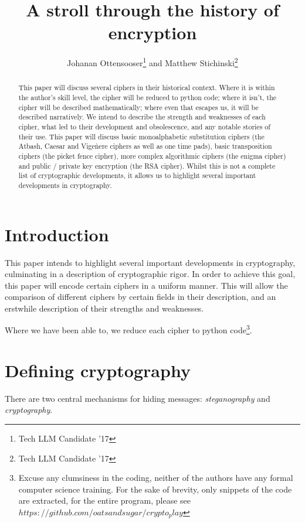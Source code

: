 \documentclass{AIAA}
\begin{document}
\title{A stroll through the history of encryption}

\author{Johanan Ottensooser\footnote{Tech LLM Candidate '17} and Matthew Stichinski\footnote{Tech LLM Candidate '17}}

\begin{abstract}
This paper will discuss several ciphers in their historical context. Where it is within the author's skill level, the cipher will be reduced to python code; where it isn't, the cipher will be described mathematically; where even that escapes us, it will be described narratively. We intend to describe the strength and weaknesses of each cipher, what led to their development and obsolescence, and any notable stories of their use. This paper will discuss basic monoalphabetic substitution ciphers (the Atbash, Caesar and Vige\`nere ciphers as well as one time pads), basic transposition ciphers (the picket fence cipher), more complex algorithmic ciphers (the enigma cipher) and public / private key encryption (the RSA cipher). Whilst this is not a complete list of cryptographic developments, it allows us to highlight several important developments in cryptography.
\end{abstract}

\maketitle

\section{Introduction}
This paper intends to highlight several important developments in cryptography, culminating in a description of cryptographic rigor. In order to achieve this goal, this paper will encode certain ciphers in a uniform manner. This will allow the comparison of different ciphers by certain fields in their description, and an erstwhile description of their strengths and weaknesses. 

Where we have been able to, we reduce each cipher to python code\footnote{Excuse any clumsiness in the coding, neither of the authors have any formal computer science training. For the sake of brevity, only snippets of the code are extracted, for the entire program, please see $https://github.com/oatsandsugar/crypto_play$}.

\section{Defining cryptography}
There are two central mechanisms for hiding messages: \textit{steganography} and \textit{cryptography}. 
\end{document}
